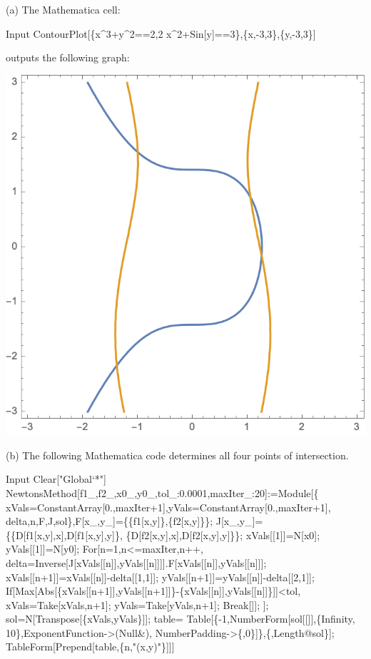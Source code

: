 \documentclass[10pt,twoside,openany]{memoir}
\begin{document}
        \begin{mdframed}
        \begin{solution}
            (a) The Mathematica cell:
\begin{mmaCell}[addtoindex=3,morefunctionlocal={x, \
y},moredefined={CellToTeX},morepattern={cell}]{Input}
ContourPlot[\{x^3+y^2==2,2 x^2+Sin[y]==3\},\{x,-3,3\},\{y,-3,3\}]
\end{mmaCell}
            outputs the following graph:
                \begin{center}
                    \includegraphics[scale=0.5]{image.png}
                \end{center}
            \phantom{a} \nl
            
            \noindent (b) The following Mathematica code determines all four points of intersection.

\begin{mmaCell}[moredefined={NewtonsMethod, f1, f2, \
table},morepattern={f1_, f2_, x0_, y0_, tol_, maxIter_, maxIter, x_, \
y_, x0, y0, tol},morelocal={xVals,
yVals, delta, n, F, J, sol}]{Input}
Clear["Global`*"]
NewtonsMethod[f1_,f2_,x0_,y0_,tol_:0.0001,maxIter_:20]:=Module[\{
     xVals=ConstantArray[0.,maxIter+1],yVals=ConstantArray[0.,maxIter+1],
     delta,n,F,J,sol\},F[x_,y_]=\{\{f1[x,y]\},\{f2[x,y]\}\};
    J[x_,y_]=\{\{D[f1[x,y],x],D[f1[x,y],y]\},
       \{D[f2[x,y],x],D[f2[x,y],y]\}\};
    xVals[[1]]=N[x0];
    yVals[[1]]=N[y0];
    For[n=1,n<=maxIter,n++,
     delta=Inverse[J[xVals[[n]],yVals[[n]]]].F[xVals[[n]],yVals[[n]]];
     xVals[[n+1]]=xVals[[n]]-delta[[1,1]];
     yVals[[n+1]]=yVals[[n]]-delta[[2,1]];
     If[Max[Abs[\{xVals[[n+1]],yVals[[n+1]]\}-\{xVals[[n]],yVals[[n]]\}]]<tol,
      xVals=Take[xVals,n+1];
      yVals=Take[yVals,n+1];
      Break[]];
    ];
    sol=N[Transpose[\{xVals,yVals\}]];
    table=
     Table[\{-1,NumberForm[sol[[]],\{Infinity, 10\},ExponentFunction->(Null&),
           NumberPadding->\{,0\}]\},\{,Length@sol\}];
    TableForm[Prepend[table,\{n,"(x,y)"\}]]]


\end{mmaCell}
\end{solution}
\end{mdframed}
\end{document}
